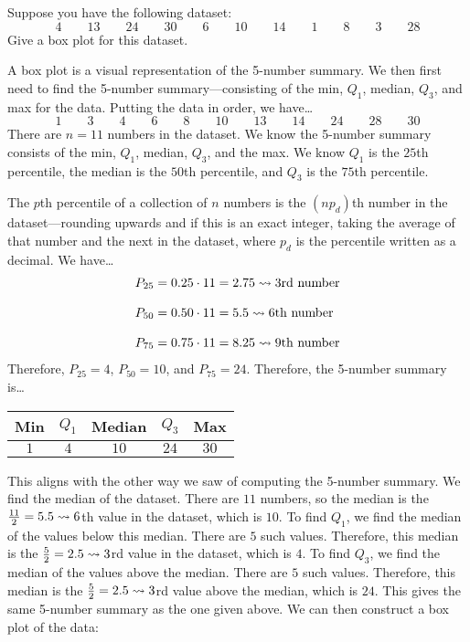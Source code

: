 \documentclass[12pt,letterpaper]{exam}
\begin{document}
\begin{questions}
\newpage
\question[10] Suppose you have the following dataset:
	\[
	4 \qquad 13 \qquad 24 \qquad 30 \qquad 6 \qquad 10 \qquad 14 \qquad 1 \qquad 8 \qquad 3 \qquad 28
	\]
Give a box plot for this dataset. \pspace

\sol A box plot is a visual representation of the 5-number summary. We then first need to find the 5-number summary---consisting of the min, $Q_1$, median, $Q_3$, and max for the data. Putting the data in order, we have\dots
	\[
	1 \qquad 3 \qquad 4 \qquad 6 \qquad 8 \qquad 10 \qquad 13 \qquad 14 \qquad24 \qquad 28 \qquad 30
	\]
There are $n= 11$ numbers in the dataset. We know the 5-number summary consists of the min, $Q_1$, median, $Q_3$, and the max. We know $Q_1$ is the $25$th percentile, the median is the $50$th percentile, and $Q_3$ is the $75$th percentile. \pspace

The $p$th percentile of a collection of $n$ numbers is the $(np_d)$th number in the dataset---rounding upwards and if this is an exact integer, taking the average of that number and the next in the dataset, where $p_d$ is the percentile written as a decimal. We have\dots
	\[
	\begin{aligned}
	P_{25}&= 0.25 \cdot 11= 2.75 \rightsquigarrow 3\text{rd number} \\[0.3cm]
	P_{50}&= 0.50 \cdot 11= 5.5 \rightsquigarrow 6\text{th number} \\[0.3cm]
	P_{75}&= 0.75 \cdot 11= 8.25 \rightsquigarrow 9\text{th number}
	\end{aligned}
	\] 
Therefore, $P_{25}= 4$, $P_{50}= 10$, and $P_{75}= 24$. Therefore, the 5-number summary is\dots \par
	\begin{table}[ht]
	\centering
	\begin{tabular}{ccccc}
	Min & $Q_1$ & Median & $Q_3$ & Max \\ \hline
	$1$ & $4$ & $10$ & $24$ & $30$
	\end{tabular}
	\end{table} 

This aligns with the other way we saw of computing the 5-number summary. We find the median of the dataset. There are $11$ numbers, so the median is the $\frac{11}{2}= 5.5 \rightsquigarrow 6$th value in the dataset, which is $10$. To find $Q_1$, we find the median of the values below this median. There are $5$ such values. Therefore, this median is the $\frac{5}{2}= 2.5 \rightsquigarrow 3$rd value in the dataset, which is $4$. To find $Q_3$, we find the median of the values above the median. There are $5$ such values. Therefore, this median is the $\frac{5}{2}= 2.5 \rightsquigarrow 3$rd value above the median, which is $24$. This gives the same 5-number summary as the one given above. We can then construct a box plot of the data:
	\begin{center}
\end{center}
\end{questions}
\end{document}
